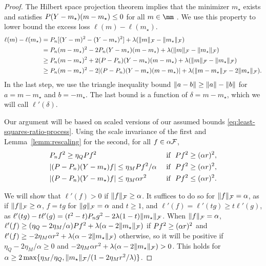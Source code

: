 \begin{proof}
The Hilbert space projection theorem implies that the minimizer $m_{\star}$ exists
and satisfies $\P(Y-m_{\star})(m-m_{\star}) \le 0$ for all $m \in \mm$ \citep[Proposition 1.37]{peypouquet2015convex}.
We use this property to lower bound the excess loss $\ell(m) - \ell(m_{\star})$. 
\begin{align*}
\ell(m) - \ell(m_{\star}) 
&= \Pn [(Y - m)^2 - (Y - m_{\star})^2] + \lambda (\norm{m}_{\F}- \norm{m_{\star}}_{\F}) \\
&= \Pn (m-m_{\star})^2 - 2\Pn (Y-m_{\star})(m-m_{\star}) + \lambda (\norm{m}_{\F}- \norm{m_{\star}}_{\F}) \\
&\ge \Pn (m-m_{\star})^2 + 2(\P - \Pn)(Y-m_{\star})(m-m_{\star})  + \lambda (\norm{m}_{\F} - \norm{m_{\star}}_{\F}) \\
&\ge \Pn (m-m_{\star})^2 - 2\abs{(\P - \Pn)(Y-m_{\star})(m-m_{\star})}  + \lambda (\norm{m-m_{\star}}_{\F} - 2 \norm{m_{\star}}_{\F}).
\end{align*}
In the last step, we use the triangle inequality bound $\lVert a-b\rVert \ge \lVert a\rVert - \lVert b\rVert$ for $a=m-m_{\star}$ and $b=-m_{\star}$.
The last bound is a function of $\delta = m-m_{\star}$, which we will call $\ell'(\delta)$.

Our argument will be based on scaled versions of our assumed bounds \eqref{eq:least-squares-ratio-process}.
Using the scale invariance of the first and Lemma~\ref{lemm:rescaling} for the second, for all $f \in \alpha \mathcal{F}$,
\begin{equation}
\label{eq:erm-ratio-bounds-scaled}
\begin{aligned}
& \Pn f^2 \ge \eta_Q \P f^2                                  & \text{ if }\ \P f^2 \ge (\alpha r)^2, \\ 
&\abs{(\P-\Pn) (Y-m_{\star})f} \le \eta_M \P f^2 / \alpha    & \text{ if }\ \P f^2 \ge (\alpha r)^2, \\
&\abs{(\P-\Pn) (Y-m_{\star})f} \le \eta_M \alpha r^2         & \text{ if }\ \P f^2 \le (\alpha r)^2. \\
\end{aligned}
\end{equation}

We will show that $\ell'(f) > 0$ if $\lVert f\rVert_{\mathcal{F}} \ge \alpha$. 
It suffices to do so for $\lVert f\rVert_{\mathcal{F}}=\alpha$, as if $\lVert f\rVert_{\mathcal{F}} \ge \alpha$,
$f=tg$ for $\lVert g\rVert_{\mathcal{F}} = \alpha$ and $t \ge 1$,
and $\ell'(f) = \ell'(tg) \ge t\ell'(g)$, as  $\ell'(tg) - t\ell'(g)= (t^2-t)\Pn g^2 - 2\lambda (1-t)\norm{m_{\star}}_{\F}$.
When $\lVert f\rVert_{\mathcal{F}}=\alpha$, 
$\ell'(f) \ge (\eta_Q - 2\eta_M/\alpha) \P f^2 +  \lambda (\alpha - 2 \norm{m_{\star}}_{\F})$ if $\P f^2 \ge (\alpha r)^2$
and $\ell'(f) \ge -2\eta_M\alpha r^2 + \lambda (\alpha - 2 \lVert m_{\star}\rVert_{\mathcal{F}})$ otherwise,
so it will be positive if $\eta_Q - 2\eta_M/\alpha \ge 0$ and  $-2\eta_M\alpha r^2 + \lambda (\alpha - 2 \lVert m_{\star}\rVert_{\mathcal{F}}) > 0$.
This holds for $\alpha \ge 2\max\{\eta_M/\eta_Q, \lVert m_{\star}\rVert_{\mathcal{F}}/(1-2\eta_M r^2/\lambda)\}$.


\end{proof}

